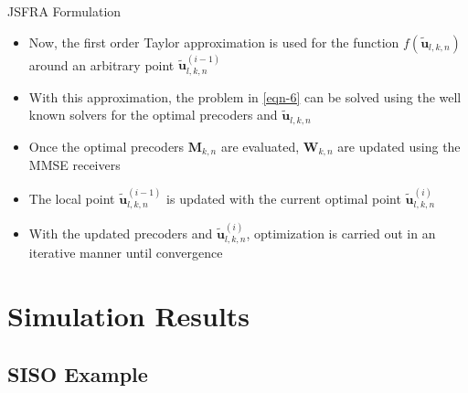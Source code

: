 \documentclass[10pt]{beamer}
\newcommand{\mbf}[1]{\mathbf{#1}}
\newcommand{\me}[1]{\( #1 \)}
\newcommand{\mvec}[2]{\mathbf{#1}_{#2}}
\begin{document}
\begin{frame}{\acs{JSFRA} Formulation}
\begin{itemize}
\item Now, the first order Taylor approximation is used for the function \me{f(\tilde{\mbf{u}}_{l,k,n})} around an arbitrary point \me{\tilde{\mbf{u}}_{l,k,n}^{(i-1)}}
\item With this approximation, the problem in \eqref{eqn-6} can be solved using the well known solvers for the optimal precoders and \me{\tilde{\mbf{u}}_{l,k,n}}
\item Once the optimal precoders \me{\mvec{M}{k,n}} are evaluated, \me{\mvec{W}{k,n}} are updated using the \acs{MMSE} receivers
\item The local point \me{\tilde{\mbf{u}}_{l,k,n}^{(i-1)}} is updated with the current optimal point \me{\tilde{\mbf{u}}_{l,k,n}^{(i)}}
\item With the updated precoders and \me{\tilde{\mbf{u}}_{l,k,n}^{(i)}}, optimization is carried out in an iterative manner until convergence
\end{itemize}
\end{frame}

\section{Simulation Results}

\subsection{SISO Example}
\end{document}
